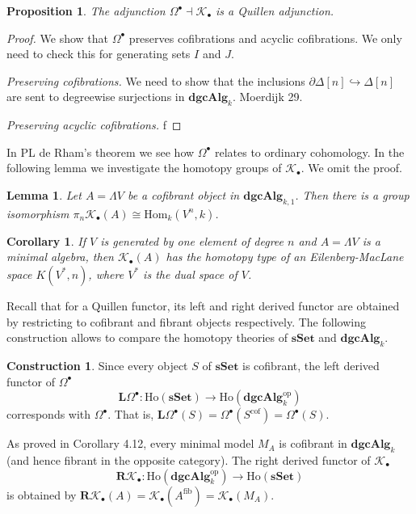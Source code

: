 \documentclass[psamsfonts]{amsart}
\newtheorem{cor}{Corollary}[section]
\newtheorem{prop}{Proposition}[section]
\newtheorem{lem}{Lemma}[section]
\theoremstyle{definition}
\newtheorem{con}{Construction}[section]
\newcommand{\sSet}{\mathbf{sSet}}
\newcommand{\dgcAlg}{\mathbf{dgcAlg}}
\newcommand{\Hom}{\mathrm{Hom}}
\newcommand{\Ho}{\mathrm{Ho}}
\numberwithin{equation}{section}
\begin{document}
\begin{prop}
The adjunction $\Omega^\bullet\dashv\mathcal{K}_\bullet$ is a Quillen adjunction.
\end{prop}
\begin{proof}
We show that $\Omega^\bullet$ preserves cofibrations and acyclic cofibrations. We only need to check this for generating sets $I$ and $J$.\medbreak

\textit{Preserving cofibrations.} We need to show that the inclusions $\partial\Delta[n]\hookrightarrow\Delta[n]$ are sent to degreewise surjections in $\dgcAlg_k$. Moerdijk 29.\medbreak

\textit{Preserving acyclic cofibrations.} f
\end{proof}

In PL de Rham's theorem we see how $\Omega^\bullet$ relates to ordinary cohomology. In the following lemma we investigate the homotopy groups of $\mathcal{K}_\bullet$. We omit the proof.

\begin{lem}
Let $A=\Lambda V$ be a cofibrant object in $\dgcAlg_{k,1}$. Then there is a group isomorphism $\pi_n\mathcal{K}_\bullet(A)\cong\Hom_k(V^n,k)$.
\end{lem}

\begin{cor}
If $V$ is generated by one element of degree $n$ and $A=\Lambda V$ is a minimal algebra, then $\mathcal{K}_\bullet(A)$ has the homotopy type of an Eilenberg-MacLane space $K(V^\ast,n)$, where $V^\ast$ is the dual space of $V$.
\end{cor}

Recall that for a Quillen functor, its left and right derived functor are obtained by restricting to cofibrant and fibrant objects respectively. The following construction allows to compare the homotopy theories of $\sSet$ and $\dgcAlg_k$.

\begin{con}
Since every object $S$ of $\sSet$ is cofibrant, the left derived functor of $\Omega^\bullet$
\[\mathbf{L}\Omega^\bullet:\Ho(\sSet)\to\Ho(\dgcAlg_k^\textrm{op})\]
corresponds with $\Omega^\bullet$. That is, $\mathbf{L}\Omega^\bullet(S)=\Omega^\bullet(S^\textrm{cof})=\Omega^\bullet(S)$.

As proved in Corollary 4.12, every minimal model $M_A$ is cofibrant in $\dgcAlg_k$ (and hence fibrant in the opposite category). The right derived functor of $\mathcal{K}_\bullet$
\[\mathbf{R}\mathcal{K}_\bullet:\Ho(\dgcAlg_k^\textrm{op})\to\Ho(\sSet)\]
is obtained by $\mathbf{R}\mathcal{K}_\bullet(A)=\mathcal{K}_\bullet(A^\textrm{fib})=\mathcal{K}_\bullet(M_A)$.
\end{con}
\end{document}
